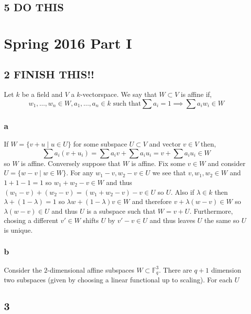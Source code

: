 \documentclass[12pt]{article}
\renewcommand{\F}{\mathbb{F}}
\begin{document}
\subsection{5 DO THIS}

\section{Spring 2016 Part I}

\subsection{2 FINISH THIS!!}

Let $k$ be a field and $V$ a $k$-vectorspace. We say that $W \subset V$ is affine if,
\[ w_1, \dots, w_n \in W, a_1, \dots, a_n \in k \text{ such that} \sum a_i = 1 \implies \sum a_i w_i \in W \]

\subsubsection{a}

If $W = \{ v + u \mid u \in U \}$ for some subspace $U \subset V$ and vector $v \in V$ then,
\[ \sum a_i (v + u_i) = \sum a_i v + \sum a_i u_i = v + \sum a_i u_i \in W \]
so $W$ is affine. Conversely suppose that $W$ is affine. Fix some $v \in W$ and consider $U = \{ w - v \mid w \in W \}$. For any $w_1 - v, w_2 - v \in U$ we see that $v, w_1, w_2 \in W$ and $1 + 1 - 1 = 1$ so $w_1 + w_2 - v \in W$ and thus $(w_1 - v) + (w_2 - v) = (w_1 + w_2 - v) - v \in U$ so $U$. Also if $\lambda \in k$ then $\lambda + (1 - \lambda) = 1$ so $\lambda w + (1 - \lambda) v \in W$ and therefore $v + \lambda (w - v) \in W$ so $\lambda (w - v) \in U$ and thus $U$ is a subspace such that $W = v + U$. Furthermore, chosing a different $v' \in W$ shifts $U$ by $v' - v \in U$ and thus leaves $U$ the same so $U$ is unique.

\subsubsection{b}

Consider the $2$-dimensional affine subspaces $W \subset \F_q^3$. There are $q + 1$ dimension two subspaces (given by choosing a linear functional up to scaling). For each $U$ 

\subsection{3}
\end{document}
